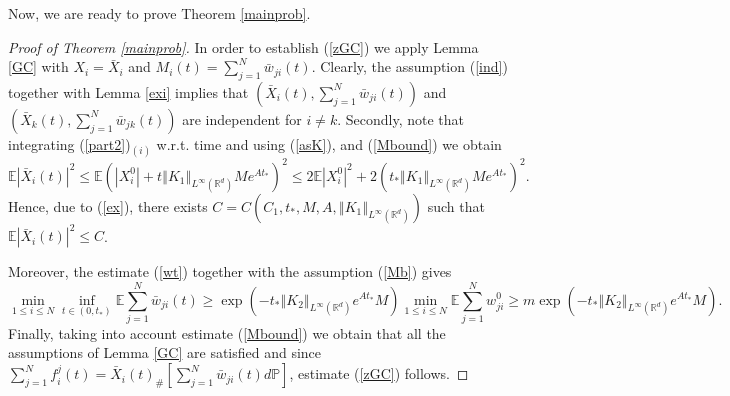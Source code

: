 \documentclass[10pt]{article}
\newcommand{\eqq}[2]{\begin{equation}  #1  \label{#2}\end{equation}    }
\newcommand*{\norm}[1]{\left\Vert{#1}\right\Vert}
\newcommand*{\abs}[1]{\left\vert{#1}\right\vert}
\newcommand{\R}{\mathbb{R}}
\newcommand{\xb}{\bar{X}}
\newcommand{\p}{\mathbb{P}}
\newcommand{\E}{\mathbb{E}}
\newcommand{\wji}{w_{ji}}
\newcommand{\wjib}{\bar{w}_{ji}}
\begin{document}
Now, we are ready to prove Theorem \ref{mainprob}.

\begin{proof}[Proof of Theorem \ref{mainprob}]
In order to establish  (\ref{zGC}) we apply Lemma \ref{GC} with $X_i=\xb_i$ and $M_i(t)=\sum_{j=1}^N\wjib(t)$. Clearly, the assumption (\ref{ind}) together with Lemma \ref{exi} implies that $(\xb_i(t),\sum_{j=1}^N\wjib(t))$
and $(\xb_k(t),\sum_{j=1}^N \bar{w}_{jk}(t))$ are independent for $i\neq k$. Secondly, note that integrating (\ref{part2})$_{(i)}$ w.r.t. time and using  (\ref{asK}), and (\ref{Mbound}) we obtain
\eqq{
\E \abs{\xb_i(t)}^2 \leq \E\left(\abs{X^0_i} + t\norm{K_1}_{L^{\infty}(\R^d)}M e^{At_*}\right)^2 \leq 2 \E\abs{X^0_i}^2 + 2\left(t_*\norm{K_1}_{L^{\infty}(\R^d)}M e^{At_*}\right)^2.
}{secmobound}
Hence, due to (\ref{ex}), there exists $C = C(C_1,t_*,M,A,\norm{K_1}_{L^{\infty}(\R^d)})$ such that $\E \abs{\xb_i(t)}^2 \leq C$.


Moreover, the estimate (\ref{wt}) together with the assumption (\ref{Mb}) gives
\eqq{
  \min_{1\leq i \leq N}\inf_{t\in (0,t_*)}\E \sum_{j=1}^N\wjib(t)\geq 
  \exp\left(-t_*\norm{K_2}_{L^{\infty}(\R^d)} e^{At_*}M\right) \min_{1\leq i \leq N}\E \sum_{j=1}^N \wji^0 \geq m  \exp\left(-t_*\norm{K_2}_{L^{\infty}(\R^d)} e^{At_*}M\right).
}{Mesti}
Finally, taking into account estimate (\ref{Mbound}) we obtain that all the assumptions of Lemma \ref{GC} are satisfied and since $\sum_{j=1}^Nf^j_i(t)=\xb_i(t)_{\#}[\sum_{j=1}^N\wjib(t)d\p]$, estimate (\ref{zGC}) follows. 


\end{proof}
\end{document}
